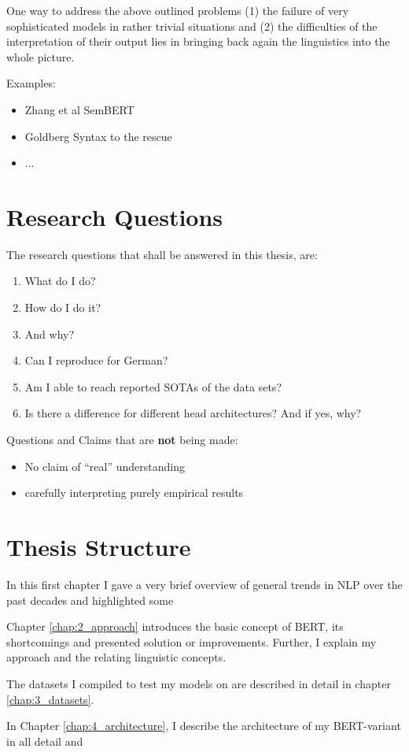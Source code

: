 One way to address the above outlined problems (1) the failure of very sophisticated models
in rather trivial situations and (2) the difficulties of the interpretation of their output
lies in bringing back again the linguistics into the whole picture.

Examples:

\begin{itemize}
	\item Zhang et al SemBERT
	\item Goldberg Syntax to the rescue
	\item ...
\end{itemize}


\section{Research Questions}

The research questions that shall be answered in this thesis, are:
\begin{enumerate}
 \item What do I do?
 \item How do I do it?
 \item And why?
	\item Can I reproduce \cite{zhang2019semantics} for German?
	\item Am I able to reach reported SOTAs of the data sets?
	\item Is there a difference for different head architectures? And if yes, why?
\end{enumerate}

Questions and Claims that are \textbf{not} being made:

\begin{itemize}
  \item No claim of ``real'' understanding
  \item carefully interpreting purely empirical results
\end{itemize}



\section{Thesis Structure}
In this first chapter I gave a very brief overview of general trends in
NLP over the past decades and highlighted some

Chapter \ref{chap:2_approach} introduces the basic concept of BERT,
its {\color{red} shortcomings} and presented solution or improvements. Further,
I explain my approach and the relating linguistic concepts.

The datasets I compiled to test my models on are described in detail
in chapter \ref{chap:3_datasets}.

In Chapter \ref{chap:4_architecture}, I describe the architecture of my
BERT-variant in all detail and

